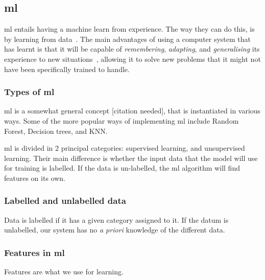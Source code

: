 
\subsection{\acrfull{ml}}


\acrlong{ml} entails having a machine learn from experience. The way they can do this, is by
learning from data~\cite[4]{marsland}. The main advantages of using a computer system that has
learnt is that it will be capable of \textit{remembering}, \textit{adapting}, and
\textit{generalising} its experience to new situations~\cite[4]{marsland}, allowing it to solve
new problems that it might not have been specifically trained to handle.

\subsubsection*{Types of \acrlong{ml}}

\acrlong{ml} is a somewhat general concept [citation needed], that is instantiated in various ways.
Some of the more popular ways of implementing \acrshort{ml} include Random Forest, Decision trees,
and KNN.


\acrshort{ml} is divided in 2 principal categories: supervised learning, and unsupervised learning.
Their main difference is whether the input data that the model will use for training is labelled. If
the data is un-labelled, the \acrshort{ml} algorithm will find features on its own.


\subsubsection*{Labelled and unlabelled data}

Data is labelled if it has a given category assigned to it. If the datum is unlabelled, our system
has no \textit{a priori} knowledge of the different data.

\subsubsection*{Features in \acrlong{ml}}

Features are what we use for learning.



